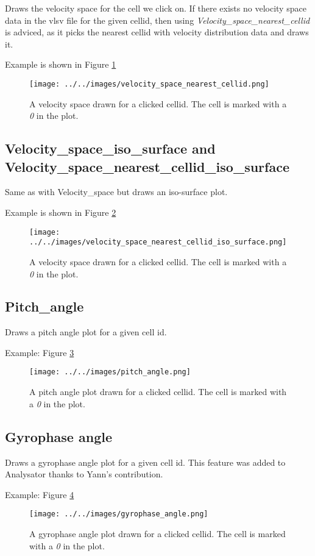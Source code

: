 \documentclass[a4paper,10pt]{article}
\begin{document}
Draws the velocity space for the cell we click on. If there exists no velocity space data in the vlsv 
file for the given cellid, then using \emph{Velocity\_space\_nearest\_cellid} is adviced, as it picks the 
nearest cellid with velocity distribution data and draws it.

Example is shown in Figure \ref{fig:vel_space}

\begin{figure}[H]
 \centering
 \texttt{[image: ../../images/velocity\_space\_nearest\_cellid.png]}
 \caption{A velocity space drawn for a clicked cellid. The cell is marked with a \emph{0} in the plot.}
 \label{fig:vel_space}
\end{figure}


\subsection{Velocity\_space\_iso\_surface and Velocity\_space\_nearest\_cellid\_iso\_surface}

Same as with Velocity\_space but draws an iso-surface plot.

Example is shown in Figure \ref{fig:vel_space2}

\begin{figure}[H]
 \centering
 \texttt{[image: ../../images/velocity\_space\_nearest\_cellid\_iso\_surface.png]}
 \caption{A velocity space drawn for a clicked cellid. The cell is marked with a \emph{0} in the plot.}
 \label{fig:vel_space2}
\end{figure}

\subsection{Pitch\_angle}

Draws a pitch angle plot for a given cell id.

Example: Figure \ref{fig:pitch_angle}

\begin{figure}[H]
 \centering
 \texttt{[image: ../../images/pitch\_angle.png]}
 \caption{A pitch angle plot drawn for a clicked cellid. The cell is marked with a \emph{0} in the plot.}
 \label{fig:pitch_angle}
\end{figure}

\subsection{Gyrophase angle}

Draws a gyrophase angle plot for a given cell id. This feature was added to Analysator thanks to Yann's 
contribution.

Example: Figure \ref{fig:gyrophase_angle}

\begin{figure}[H]
 \centering
 \texttt{[image: ../../images/gyrophase\_angle.png]}
 \caption{A gyrophase angle plot drawn for a clicked cellid. The cell is marked with a \emph{0} in the plot.}
 \label{fig:gyrophase_angle}
\end{figure}
\end{document}
